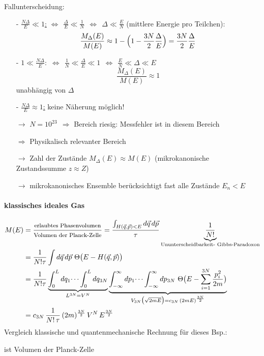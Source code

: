 Fallunterscheidung:
\begin{itemize}
    \item[-] \underline{$\frac{N \Delta}{E} \ll 1$:} $\Leftrightarrow \ \ \frac{\Delta}{E} \ll \frac{1}{N} \ \ \Leftrightarrow \ \ \Delta \ll \frac{E}{N}$ (mittlere Energie pro Teilchen): \\
    \begin{equation}
        \frac{M_\Delta(E)}{M(E)} \approx 1- \Bigl( 1- \frac{3N}{2} \frac{\Delta}{E} \Bigr)= \frac{3N}{2} \frac{\Delta}{E}
    \end{equation}
    \item[-] \underline{$1 \ll \frac{N \Delta}{E}:$} $\Leftrightarrow \ \ \frac{1}{N} \ll \frac{\Delta}{E} \ll 1 \ \ \Leftrightarrow \ \ \frac{E}{N} \ll \Delta \ll E$
    \begin{equation}
        \frac{M_\Delta(E)}{M(E)} \approx 1
    \end{equation}
    unabhängig von $\Delta$
    \item[-] \underline{$\frac{N\Delta}{E} \approx 1$:} keine Näherung möglich! 
    \item[$\rightarrow$] $N = 10^{23} \ \ \Rightarrow$ Bereich riesig: Messfehler ist in diesem Bereich
     \item[$\Rightarrow$] Physikalisch relevanter Bereich
      \item[$\rightarrow$] Zahl der Zustände $M_\Delta(E) \approx M(E)$ (mikrokanonische Zustandssumme $z \approx Z$)
       \item[$\rightarrow$]mikrokanonisches Ensemble berücksichtigt fast alle Zustände $E_n < E$
\end{itemize}

\paragraph{klassisches ideales Gas}
\begin{align}
    M(E) &= \frac{\text{\footnotesize{erlaubtes Phasenvolumen}}}{\text{\footnotesize{Volumen der Planck-Zelle}}} = \frac{\int_{H (\Vec{q},\Vec{p}) < E} d\Vec{q}\, d\Vec{p}}{\tau} \underbrace{\frac{1}{N!}}_{\text{Ununterscheidbarkeit- Gibbs-Paradoxon}} \\
    &= \frac{1}{N! \tau} \int d\Vec{q} \, d\Vec{p} \ \Theta\bigl(E-H(\Vec{q}, \Vec{p})\bigr) \\
    &= \frac{1}{N! \tau} \underbrace{\int_0^L dq_1 \dots \int_0^L dq_{3N}}_{L^{3N}= V^N} \underbrace{\int_{-\infty}^\infty dp_1 \dots \int_{-\infty}^\infty dp_{3N} \ \Theta\bigl( E- \sum_{i=1}^{3N} \frac{p_i^2}{2m}\bigr)}_{V_{3N}\bigl(\sqrt{2mE}\bigr) = c_{3N} \, (2mE)^{\frac{3N}{2}}}\\
    &=c_{3N} \, \frac{1}{N! \, \tau} \, (2m)^{\frac{3N}{2}} \, V^N \, E^\frac{3N}{2}
\end{align}
Vergleich klassische und quantenmechanische Rechnung für dieses Bsp.:
\begin{center}
\end{center}
 ist Volumen der Planck-Zelle

